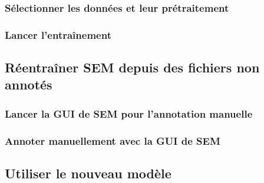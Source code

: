 \documentclass[12pt]{article}
\begin{document}
            \subsubsection{Sélectionner les données et leur prétraitement}
            
            
            \subsubsection{Lancer l'entraînement}
            \label{subsubsec:train-SEM-from-annotated}
            
        
        \subsection{Réentraîner SEM depuis des fichiers non annotés}
        
        
            \subsubsection{Lancer la GUI de SEM pour l'annotation manuelle}
            
        
            \subsubsection{Annoter manuellement avec la GUI de SEM}
            
        
        \subsection{Utiliser le nouveau modèle}
        
    
    
    
\end{document}
